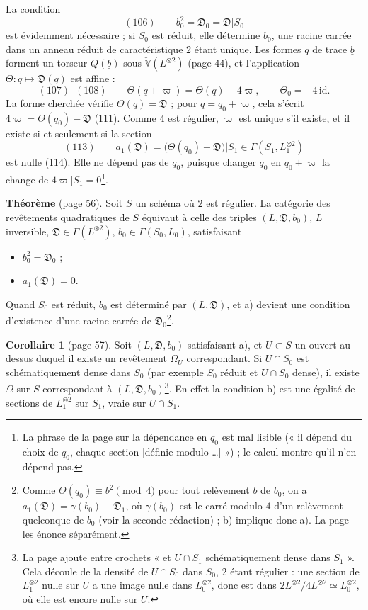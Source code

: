 \documentclass[11pt,a4paper]{article}
\begin{document}
La condition
\[
  (106) \qquad b_0^2 = \mathfrak{D}_0 = \mathfrak{D}|S_0
\]
est évidemment nécessaire ; si $S_0$ est réduit, elle détermine $b_0$, une racine
carrée dans un anneau réduit de caractéristique $2$ étant unique. Les formes $q$ de
trace $\underline{b}$ forment un torseur $Q(\underline{b})$ sous
$\check{\mathbb{V}}(L^{\otimes 2})$ (page 44), et l'application $\Theta : q \mapsto
\mathfrak{D}(q)$ est affine :
\[
  (107)\text{--}(108) \qquad \Theta(q + \varpi) = \Theta(q) - 4\varpi, \qquad
  \Theta_0 = -4\,\mathrm{id}.
\]
La forme cherchée vérifie $\Theta(q) = \mathfrak{D}$ ; pour $q = q_0 + \varpi$, cela
s'écrit $4\varpi = \Theta(q_0) - \mathfrak{D}$ (111). Comme $4$ est régulier,
$\varpi$ est unique s'il existe, et il existe si et seulement si la section
\[
  (113) \qquad a_1(\mathfrak{D}) = \bigl(\Theta(q_0) - \mathfrak{D}\bigr)|S_1 \in
  \Gamma(S_1, L_1^{\otimes 2})
\]
est nulle (114). Elle ne dépend pas de $q_0$, puisque changer $q_0$ en $q_0 +
\varpi$ la change de $4\varpi|S_1 = 0$\footnote{La phrase de la page sur la
dépendance en $q_0$ est mal lisible (« il dépend du choix de $q_0$, chaque section
[définie modulo …] ») ; le calcul montre qu'il n'en dépend pas.}.

\textbf{Théorème} (page 56). Soit $S$ un schéma où $2$ est régulier. La catégorie des
revêtements quadratiques de $S$ équivaut à celle des triples $(L, \mathfrak{D},
b_0)$, $L$ inversible, $\mathfrak{D} \in \Gamma(L^{\otimes 2})$, $b_0 \in \Gamma(S_0,
L_0)$, satisfaisant
\begin{itemize}
  \item[a)] $b_0^2 = \mathfrak{D}_0$ ;
  \item[b)] $a_1(\mathfrak{D}) = 0$.
\end{itemize}
Quand $S_0$ est réduit, $b_0$ est déterminé par $(L, \mathfrak{D})$, et a) devient une
condition d'existence d'une racine carrée de $\mathfrak{D}_0$\footnote{Comme $\Theta(q_0)
\equiv b^2 \pmod 4$ pour tout relèvement $b$ de $b_0$, on a $a_1(\mathfrak{D}) =
\gamma(b_0) - \mathfrak{D}_1$, où $\gamma(b_0)$ est le carré modulo $4$ d'un relèvement
quelconque de $b_0$ (voir la seconde rédaction) ; b) implique donc a). La page les
énonce séparément.}.

\textbf{Corollaire 1} (page 57). Soit $(L, \mathfrak{D}, b_0)$ satisfaisant a), et $U
\subset S$ un ouvert au-dessus duquel il existe un revêtement $\Omega_U$ correspondant.
Si $U \cap S_0$ est schématiquement dense dans $S_0$ (par exemple $S_0$ réduit et $U
\cap S_0$ dense), il existe $\Omega$ sur $S$ correspondant à $(L, \mathfrak{D},
b_0)$\footnote{La page ajoute entre crochets « et $U \cap S_1$ schématiquement dense
dans $S_1$ ». Cela découle de la densité de $U \cap S_0$ dans $S_0$, $2$ étant
régulier : une section de $L_1^{\otimes 2}$ nulle sur $U$ a une image nulle dans
$L_0^{\otimes 2}$, donc est dans $2L^{\otimes 2}/4L^{\otimes 2} \simeq
L_0^{\otimes 2}$, où elle est encore nulle sur $U$.}. En effet la condition b) est
une égalité de sections de $L_1^{\otimes 2}$ sur $S_1$, vraie sur $U \cap S_1$.
\end{document}
